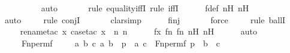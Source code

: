 \begin{isabellebody}
\ \ \ \ \ \ \ \ \isamarkupfalse%
\ auto{\isacharbrackleft}{\kern0pt}{}{\isacharbrackright}{\kern0pt}\isanewline
\ \ \ \ \ \ \isamarkupfalse%
{\isacharparenleft}{\kern0pt}rule\ equality{\isacharunderscore}{\kern0pt}iffI{\isacharcomma}{\kern0pt}\ rule\ iffI{\isacharparenright}{\kern0pt}\isanewline
\ \ \ \ \isamarkupfalse%
\ f{\isacharunderscore}{\kern0pt}def\ nH\ n{\isacharprime}{\kern0pt}H\isanewline
\ \ \ \ \ \ \ \isamarkupfalse%
\ auto{\isacharbrackleft}{\kern0pt}{}{\isacharbrackright}{\kern0pt}\isanewline
\ \ \ \ \isamarkupfalse%
{\isacharparenleft}{\kern0pt}rule\ conjI{\isacharparenright}{\kern0pt}\isanewline
\ \ \ \ \ \isamarkupfalse%
\ clarsimp\isanewline
\ \ \ \ \isamarkupfalse%
\ finj\isanewline
\ \ \ \ \ \isamarkupfalse%
\ force\isanewline
\ \ \ \ \isamarkupfalse%
{\isacharparenleft}{\kern0pt}rule\ ballI{\isacharparenright}{\kern0pt}\isanewline
\ \ \ \ \isamarkupfalse%
{\isacharparenleft}{\kern0pt}rename{\isacharunderscore}{\kern0pt}tac\ x{\isacharcomma}{\kern0pt}\ case{\isacharunderscore}{\kern0pt}tac\ {\isachardoublequoteopen}x\ {\isasymin}\ {\isacharbraceleft}{\kern0pt}n{\isacharcomma}{\kern0pt}\ n{\isacharprime}{\kern0pt}{\isacharbraceright}{\kern0pt}{\isachardoublequoteclose}{\isacharparenright}{\kern0pt}\isanewline
\ \ \ \ \isamarkupfalse%
\ fx\ fn\ fn{\isacharprime}{\kern0pt}\ nH\ n{\isacharprime}{\kern0pt}H\isanewline
\ \ \ \ \isamarkupfalse%
\ auto\isanewline
\ \isanewline
\ \ \isamarkupfalse%
\ {\isasympi}\ \ {\isachardoublequoteopen}{\isasympi}\ {\isasymequiv}\ Fn{\isacharunderscore}{\kern0pt}perm{\isacharprime}{\kern0pt}{\isacharparenleft}{\kern0pt}f{\isacharparenright}{\kern0pt}{\isachardoublequoteclose}\ \isanewline
\isanewline
\ \ \isamarkupfalse%
\ {\isachardoublequoteopen}{\isasymAnd}a\ b\ c{\isachardot}{\kern0pt}\ {\isacharless}{\kern0pt}a{\isacharcomma}{\kern0pt}\ b{\isachargreater}{\kern0pt}\ {\isasymin}\ p\ {\isasymLongrightarrow}\ {\isacharless}{\kern0pt}a{\isacharcomma}{\kern0pt}\ c{\isachargreater}{\kern0pt}\ {\isasymin}\ Fn{\isacharunderscore}{\kern0pt}perm{\isacharparenleft}{\kern0pt}f{\isacharcomma}{\kern0pt}\ p{\isacharparenright}{\kern0pt}\ {\isasymLongrightarrow}\ b\ {\isacharequal}{\kern0pt}\ c{\isachardoublequoteclose}\ \isanewline
\ \ \isamarkupfalse%
\ {\isacharminus}{\kern0pt}\ \isanewline
\ \ \ \ \isamarkupfalse%

\end{isabellebody}
